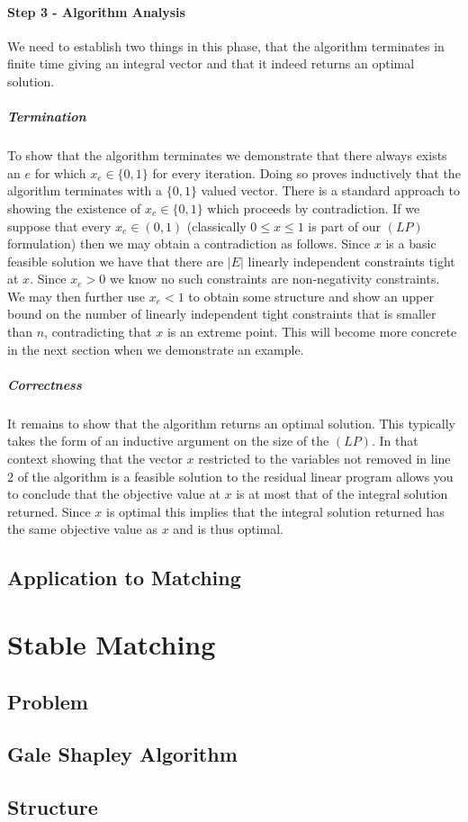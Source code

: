 \paragraph{Step 3 - Algorithm Analysis}
We need to establish two things in this phase, that the algorithm terminates in finite time giving an integral vector and that it indeed returns an optimal solution.
\subparagraph{Termination} To show that the algorithm terminates we demonstrate that there always exists an $e$ for which $x_e \in \{0,1\}$ for every iteration. Doing so proves inductively that the algorithm terminates with a $\{0,1\}$ valued vector. There is a standard approach to showing the existence of $x_e \in \{0,1\}$ which proceeds by contradiction. If we suppose that every $x_e \in (0,1)$ (classically $0\leq x \leq 1$ is part of our $(LP)$ formulation) then we may obtain a contradiction as follows. Since $x$ is a basic feasible solution we have that there are $|E|$ linearly independent constraints tight at $x$. Since $x_e > 0$ we know no such constraints are non-negativity constraints. We may then further use $x_e < 1$ to obtain some structure and show an upper bound on the number of linearly independent tight constraints that is smaller than $n$, contradicting that $x$ is an extreme point. This will become more concrete in the next section when we demonstrate an example.
\subparagraph{Correctness} It remains to show that the algorithm returns an optimal solution. This typically takes the form of an inductive argument on the size of the $(LP)$. In that context showing that the vector $x$ restricted to the variables not removed in line $2$ of the algorithm is a feasible solution to the residual linear program allows you to conclude that the objective value at $x$ is at most that of the integral solution returned. Since $x$ is optimal this implies that the integral solution returned has the same objective value as $x$ and is thus optimal.
\subsection{Application to Matching}
\section{Stable Matching}
\subsection{Problem}
\subsection{Gale Shapley Algorithm}
\subsection{Structure}

